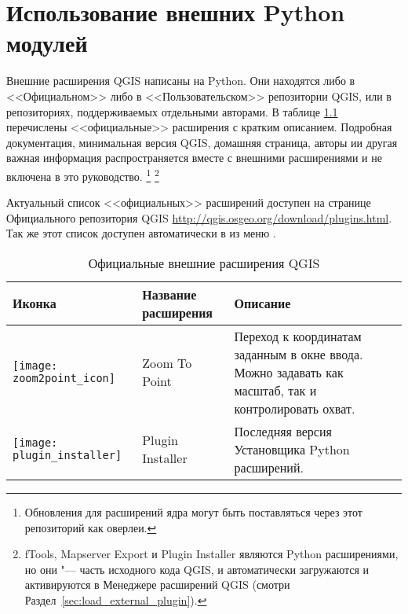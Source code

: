 
\chapter{Использование внешних Python модулей}\label{sec:external_plugins}


Внешние расширения QGIS написаны на Python. Они находятся либо в <<Официальном>>
либо в <<Пользовательском>> репозитории QGIS, или в репозиториях, поддерживаемых
отдельными авторами.
В таблице \ref{tab:external_plugins} перечислены <<официальные>> расширения с
кратким описанием.
Подробная документация, минимальная версия QGIS, домашняя страница, авторы
ии другая важная информация распространяется вместе с внешними расширениями
и не включена в это руководство.
\footnote{Обновления для расширений ядра могут быть поставляться через этот
репозиторий как оверлеи.}
\footnote{fTools, Mapserver Export и Plugin Installer являются Python
расширениями, но они "--- часть исходного кода QGIS, и автоматически
загружаются и активируются в Менеджере расширений QGIS
(смотри Раздел~\ref{sec:load_external_plugin}).}

Актуальный список <<официальных>> расширений доступен на странице Официального
репозитория QGIS \url{http://qgis.osgeo.org/download/plugins.html}. Так же
этот список доступен автоматически в 
из меню .

\begin{table}[H]
\centering
 \begin{tabular}{|l|l|p{8cm}|}
\hline \textbf{Иконка} & \textbf{Название расширения} & \textbf{Описание}\\
\hline
\texttt{[image: zoom2point\_icon]}
 & Zoom To Point \index{plugins!Zoom To Point} & Переход к координатам
  заданным в окне ввода. Можно задавать как масштаб, так и
  контролировать охват.\\
\hline
\texttt{[image: plugin\_installer]}
 & Plugin Installer \index{plugins!Plugin Installer} & Последняя версия Установщика Python расширений.\\
\hline
\end{tabular}
\caption{Официальные внешние расширения QGIS}\label{tab:external_plugins}
\end{table}

